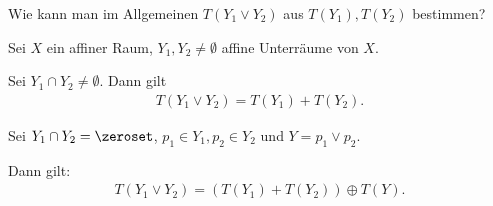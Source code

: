 \begin{frage*}
    Wie kann man im Allgemeinen \( T(Y_1\vee Y_2) \) aus \( T(Y_1),T(Y_2) \) bestimmen?
\end{frage*}
\begin{lemma}\label{verbindungsraum:translationen}
    Sei \( X \) ein affiner Raum, \( Y_1,Y_2\neq\emptyset \) affine Unterräume von \( X \).
    \begin{eigenschaftenenumerate}
        \item \label{verbindungsraum:translationen:schnitt_nicht_leer}Sei \( Y_1\cap Y_2\neq \emptyset \).
        Dann gilt
        \begin{align*}
            T(Y_1\vee Y_2)=T(Y_1)+T(Y_2).
        \end{align*}
        
        \item \label{verbindungsraum:translationen:schnitt_leer}Sei \( Y_1\cap Y_2=\zeroset \), \( p_1\in Y_1, p_2\in Y_2\) und \( Y=p_1\vee p_2 \).
        
        Dann gilt:
        \begin{align*}
            T(Y_1\vee Y_2)=(T(Y_1)+T(Y_2))\oplus T(Y).
        \end{align*}
    \end{eigenschaftenenumerate}
\end{lemma}
